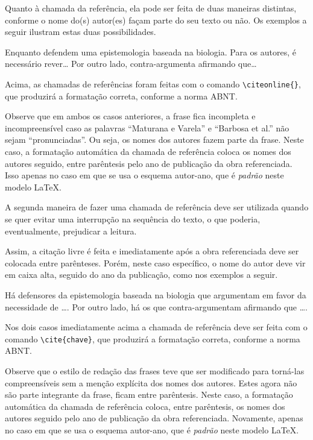 \begin{apendicesenv}
    Quanto à chamada da referência, ela pode ser feita de duas maneiras distintas, conforme o nome do(s) autor(es) façam parte do seu texto ou não.
    Os exemplos a seguir ilustram estas duas possibilidades.

    Enquanto  defendem uma epistemologia baseada na biologia.
    Para os autores, é necessário rever\ldots
    Por outro lado,  contra-argumenta afirmando que\ldots

    Acima, as chamadas de referências foram feitas com o comando \verb|\citeonline{}|, que produzirá a formatação correta, conforme a norma ABNT.

    Observe que em ambos os casos anteriores, a frase fica incompleta e incompreensível caso as palavras ``Maturana e Varela'' e ``Barbosa et al.'' não sejam ``pronunciadas''.
    Ou seja, os nomes dos autores fazem parte da frase.
    Neste caso, a formatação automática da chamada de referência coloca os nomes dos autores seguido, entre parêntesis pelo ano de publicação da obra referenciada.
    Isso apenas no caso em que se usa o esquema autor-ano, que é \textit{padrão} neste modelo \LaTeX{}.

    A segunda maneira de fazer uma chamada de referência deve ser utilizada quando se quer evitar uma interrupção na sequência do texto, o que poderia, eventualmente, prejudicar a leitura.

    \newpage

    Assim, a citação livre é feita e imediatamente após a obra referenciada deve ser colocada entre parênteses.
    Porém, neste caso específico, o nome do autor deve vir em caixa alta, seguido do ano da publicação, como nos exemplos a seguir.

    Há defensores da epistemologia baseada na biologia que argumentam em favor da necessidade de \ldots \cite{Maturana2003}.
    Por outro lado, há os que contra-argumentam afirmando que \ldots  \cite{Barbosa2004}.

    Nos dois casos imediatamente acima a chamada de referência deve ser feita com o comando \verb|\cite{chave}|, que produzirá a formatação correta, conforme a norma ABNT.

    Observe que o estilo de redação das frases teve que ser modificado para torná-las compreensíveis sem a menção explícita dos nomes dos autores.
    Estes agora não são parte integrante da frase, ficam entre parêntesis.
    Neste caso, a formatação automática da chamada de referência coloca, entre parêntesis, os nomes dos autores seguido pelo ano de publicação da obra referenciada.
    Novamente, apenas no caso em que se usa o esquema autor-ano, que é \textit{padrão} neste modelo \LaTeX{}.


\end{apendicesenv}
